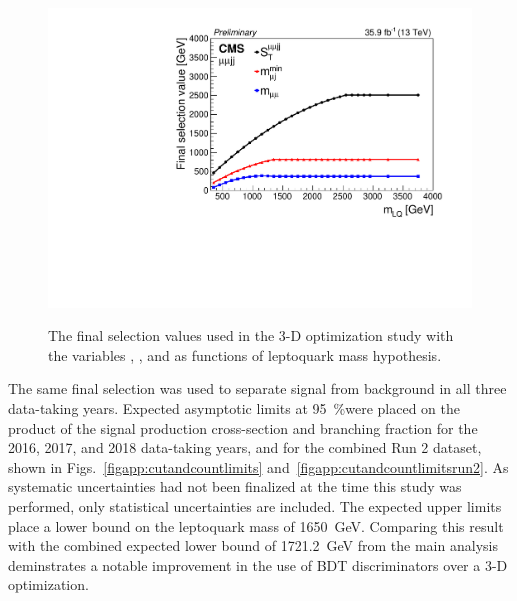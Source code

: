 \begin{figure}[H]
    \centering
    {\includegraphics[width=.48\textwidth]{Images/Analysis/Results_Testing_2016_stockNanoAODv6/optPlotuujj_FinalSel.pdf}}
    \caption{The final selection values used in the 3-D optimization study with the variables \Muu, \ST, and \MujTwo as functions of leptoquark mass hypothesis.}
    \label{figapp:3doptimizedcuts}
\end{figure}

The same final selection was used to separate signal from background in all three data-taking years. Expected asymptotic limits at \SI{95}{\%}\CL were placed on the product of the signal production cross-section and branching fraction for the 2016, 2017, and 2018 data-taking years, and for the combined Run 2 dataset, shown in Figs.~\ref{figapp:cutandcountlimits} and~\ref{figapp:cutandcountlimitsrun2}. As systematic uncertainties had not been finalized at the time this study was performed, only statistical uncertainties are included. The expected upper limits place a lower bound on the leptoquark mass of 1650~GeV. Comparing this result with the combined expected lower bound of 1721.2~GeV from the main analysis deminstrates a notable improvement in the use of BDT discriminators over a 3-D optimization. 

